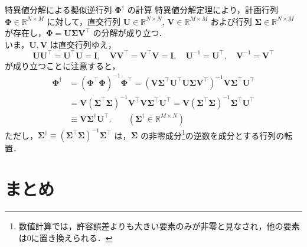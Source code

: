\documentclass[uplatex,11pt,dvipdfmx,aspectratio=169,unicode,t]{beamer}
\numberwithin{equation}{section}
\newcommand{\BR}{\mathbb{R}}
\newcommand{\mb}[1]{\mathbf{#1}}
\newcommand{\bs}[1]{\boldsymbol{#1}}
\newcommand{\1}{\bs{1}}
\newcommand{\0}{\bs{0}}
\begin{document}
\begin{frame}{特異値分解による擬似逆行列 $\bs{\Phi}^{\dagger}$ の計算}
    特異値分解定理により，計画行列 $\bs{\Phi} \in \BR^{N \times M}$ に対して，直交行列 $\mb{U} \in \BR^{N \times N}$, $\mb{V} \in \BR^{M \times M}$ および行列 $\mb{\Sigma} \in \BR^{N \times M}$ が存在し，$\bs{\Phi} = \mb{U} \mb{\Sigma} \mb{V}^{\top}$ の分解が成り立つ．\\
    いま，$\mb{U},\mb{V}$ は直交行列ゆえ，
    \begin{equation}
        \mb{U}\mb{U}^{\top} = \mb{U}^{\top}\mb{U} = \mb{I}, \quad \mb{V}\mb{V}^{\top} = \mb{V}^{\top}\mb{V} = \mb{I}, \quad \mb{U}^{-1} = \mb{U}^{\top}, \quad \mb{V}^{-1} = \mb{V}^{\top}
    \end{equation}
    が成り立つことに注意すると，
    \begin{align}
        \bs{\Phi}^{\dagger} &= \left(\bs{\Phi}^{\top}\bs{\Phi}\right)^{-1} \bs{\Phi}^{\top} = \left(\mb{V} \mb{\Sigma}^{\top} \mb{U}^{\top} \mb{U} \mb{\Sigma} \mb{V}^{\top}\right)^{-1} \mb{V} \mb{\Sigma}^{\top} \mb{U}^{\top} \\
        &= \mb{V} \left(\mb{\Sigma}^{\top} \mb{\Sigma}\right)^{-1} \mb{V}^{\top} \mb{V} \mb{\Sigma}^{\top} \mb{U}^{\top} = \mb{V} \left(\mb{\Sigma}^{\top} \mb{\Sigma}\right)^{-1} \mb{\Sigma}^{\top} \mb{U}^{\top} \\
        &\equiv \mb{V} \mb{\Sigma}^{\dagger} \mb{U}^{\top}. \qquad (\mb{\Sigma}^{\dagger} \in \BR^{M \times N})
    \end{align}
    \vspace{11pt}
    ただし，$\mb{\Sigma}^{\dagger} \equiv \left(\mb{\Sigma}^{\top} \mb{\Sigma}\right)^{-1} \mb{\Sigma}^{\top}$ は，$\mb{\Sigma}$ の非零成分\footnote{数値計算では，許容誤差よりも大きい要素のみが非零と見なされ，他の要素は0に置き換えられる．}の逆数を成分とする行列の転置．
\end{frame}

\section{まとめ}
\end{document}
